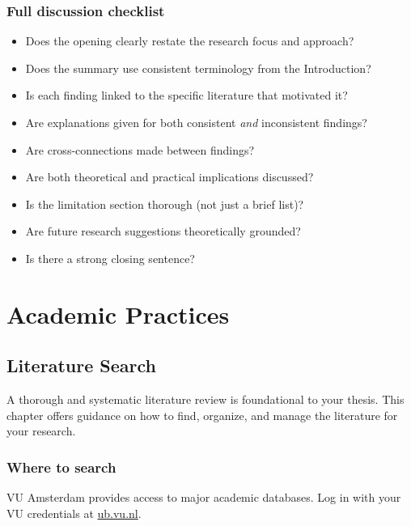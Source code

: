 \documentclass[
  11pt,
  a4paper,
]{scrbook}
\providecommand{\tightlist}{%
  \setlength{\itemsep}{0pt}\setlength{\parskip}{0pt}}\usepackage{longtable,booktabs,array}
\begin{document}
\section{Full discussion checklist}\label{full-discussion-checklist}

\begin{itemize}
\tightlist
\item[$\square$]
  Does the opening clearly restate the research focus and approach?
\item[$\square$]
  Does the summary use consistent terminology from the Introduction?
\item[$\square$]
  Is each finding linked to the specific literature that motivated it?
\item[$\square$]
  Are explanations given for both consistent \emph{and} inconsistent
  findings?
\item[$\square$]
  Are cross-connections made between findings?
\item[$\square$]
  Are both theoretical and practical implications discussed?
\item[$\square$]
  Is the limitation section thorough (not just a brief list)?
\item[$\square$]
  Are future research suggestions theoretically grounded?
\item[$\square$]
  Is there a strong closing sentence?
\end{itemize}

\part{Academic Practices}

\chapter{Literature Search}\label{literature-search}

A thorough and systematic literature review is foundational to your
thesis. This chapter offers guidance on how to find, organize, and
manage the literature for your research.

\section{Where to search}\label{where-to-search}

VU Amsterdam provides access to major academic databases. Log in with
your VU credentials at \href{https://ub.vu.nl}{ub.vu.nl}.
\end{document}
